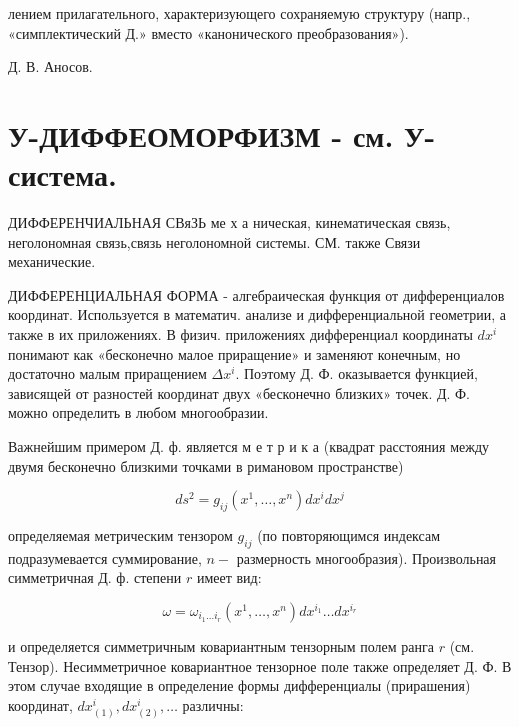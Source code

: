 \documentclass[10pt]{article}
\begin{document}
лением прилагательного, характеризующего сохраняемую структуру (напр., «симплектический Д.» вместо «канонического преобразования»).



Д. В. Аносов.



\section{У-ДИФФЕОМОРФИЗМ - см. У-система.}

ДИФФЕРЕНЧИАЛЬНАЯ СВяЗЬ ме х а ническая, кинематическая связь, неголономная связь,связь неголономной системы. СМ. также Связи механические.



ДИФФЕРЕНЦИАЛЬНАЯ ФОРМА - алгебраическая функция от дифференциалов координат. Используется в математич. анализе и дифференциальной геометрии, а также в их приложениях. В физич. приложениях дифференциал координаты $d x^{i}$ понимают как «бесконечно малое приращение» и заменяют конечным, но достаточно малым приращением $\Delta x^{i}$. Поэтому Д. Ф. оказывается функцией, зависящей от разностей координат двух «бесконечно близких» точек. Д. Ф. можно определить в любом многообразии.



Важнейшим примером Д. ф. является м е т р и к а (квадрат расстояния между двумя бесконечно близкими точками в римановом пространстве)



\[

d s^{2}=g_{i j}\left(x^{1}, \ldots, x^{n}\right) d x^{i} d x^{j}

\]



определяемая метрическим тензором $g_{i j}$ (по повторяющимся индексам подразумевается суммирование, $n-$ размерность многообразия). Произвольная симметричная Д. ф. степени $r$ имеет вид:



\[

\omega=\omega_{i_{1} \ldots i_{r}}\left(x^{1}, \ldots, x^{n}\right) d x^{i_{1}} \ldots d x^{i_{r}}

\]



и определяется симметричным ковариантным тензорным полем ранга $r$ (см. Тензор). Несимметричное ковариантное тензорное поле также определяет Д. Ф. В этом случае входящие в определение формы дифференциалы (прирашения) координат, $d x_{(1)}^{i}, d x_{(2)}^{i}, \ldots$ различны:
\end{document}
